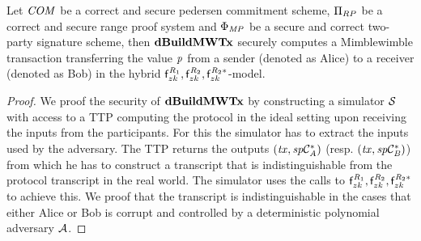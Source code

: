 \begin{theorem}
    \label{theo:atom:sec-tx}
    Let $\mathit{COM}$ be a correct and secure pedersen commitment scheme, $\Pi_{RP}$ be a correct and secure range proof system and $\Phi_{\mathit{MP}}$ be a secure and correct two-party signature scheme, then $\mathbf{dBuildMWTx}$ securely computes a Mimblewimble transaction transferring the value $\mathit{p}$ from a sender (denoted as Alice) to a receiver (denoted as Bob) in the hybrid $\mathsf{f}^{\mathit{R}_1}_{zk}, \mathsf{f}^{\mathit{R}_2}_{zk}, \mathsf{f}^{\mathit{R}_2*}_{zk}$-model.
\end{theorem}

\begin{proof} \label{prf:atom:sec-dbuildmw}
    We proof the security of $\mathbf{dBuildMWTx}$ by constructing a simulator $\mathcal{S}$ with access to a TTP computing the protocol in the ideal setting upon receiving the inputs from the participants.
    For this the simulator has to extract the inputs used by the adversary.
    The TTP returns the outputs $(\mathit{tx}, \mathit{sp}\mathcal{C}_{\mathit{A}}^*)$ (resp. $(\mathit{tx}, \mathit{sp}\mathcal{C}_{\mathit{B}}^*)$) from which he has to construct a transcript that is indistinguishable from the protocol transcript in the real world. The simulator uses the calls to $\mathsf{f}^{\mathit{R}_1}_{zk}, \mathsf{f}^{\mathit{R}_2}_{zk}, \mathsf{f}^{\mathit{R}_2*}_{zk}$ to achieve this.
    We proof that the transcript is indistinguishable in the cases that either Alice or Bob is corrupt and controlled by a deterministic polynomial adversary $\mathcal{A}$.


\end{proof}
